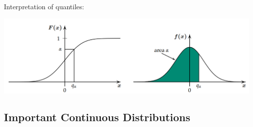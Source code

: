 \documentclass[11pt]{article}
\newcommand*\samplemean[1]{\overline{#1}}
\newcommand*\N[1]{\mathcal{N}\left(#1\right)}
\begin{document}
Interpretation of quantiles:
\begin{center}
	\includegraphics[width=0.8\linewidth]{img/quantile}
\end{center}

\subsection{Important Continuous Distributions}



\end{document}
